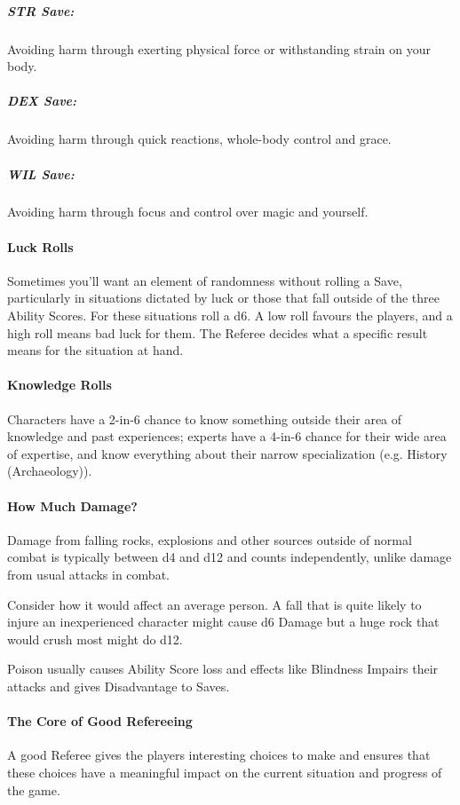 \documentclass[itdr]{subfiles}
\begin{document}
\subparagraph{STR Save:} Avoiding harm through exerting physical force or withstanding strain on your body.

\subparagraph{DEX Save:} Avoiding harm through quick reactions, whole-body control and grace.

\subparagraph{WIL Save:} Avoiding harm through focus and control over magic and yourself.

\paragraph{Luck Rolls}
Sometimes you'll want an element of randomness without rolling a Save, particularly in situations dictated by luck or those that fall outside of the three Ability Scores. For these situations roll a d6. A low roll favours the players, and a high roll means bad luck for them. The Referee decides what a specific result means for the situation at hand.

\paragraph{Knowledge Rolls}
Characters have a 2-in-6 chance to know something outside their area of knowledge and past experiences; experts have a 4-in-6 chance for their wide area of expertise, and know everything about their narrow specialization (e.g. History (Archaeology)).

\paragraph{How Much Damage?}
Damage from falling rocks, explosions and other sources outside of normal combat is typically between d4 and d12 and counts independently, unlike damage from usual attacks in combat.

Consider how it would affect an average person. A fall that is quite likely to injure an inexperienced character might cause d6 Damage but a huge rock that would crush most might do d12.

Poison usually causes Ability Score loss and effects like Blindness Impairs their attacks and gives Disadvantage to Saves.

\paragraph{The Core of Good Refereeing}
A good Referee gives the players interesting choices to make and ensures that these choices have a meaningful impact on the current situation and progress of the game.
\end{document}
